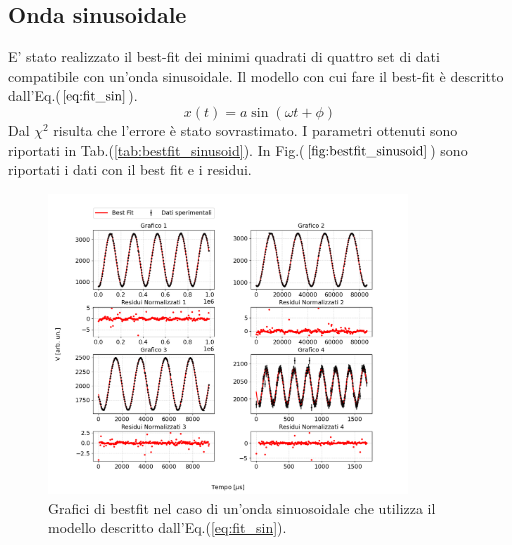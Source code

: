 \documentclass{article}
\begin{document}
    \subsection{Onda sinusoidale}
        E' stato realizzato il best-fit dei minimi quadrati
        di quattro set di dati compatibile con un'onda sinusoidale.
        Il modello con cui fare il best-fit è descritto dall'Eq.($\ref{eq:fit_sin}$).
            \begin{equation}
                x(t)=a \sin\left(\omega t+\phi\right)
                \label{eq:fit_sin}
            \end{equation} 
        Dal $\chi^2$ risulta che l'errore è stato sovrastimato. 
        I parametri ottenuti sono riportati in Tab.(\ref{tab:bestfit_sinusoid}).%
        In Fig.($\ref{fig:bestfit_sinusoid}$) sono riportati i dati con il best fit e 
        i residui.

            \begin{figure}[H]            
                \centering
                \includegraphics[width=0.85\textwidth]{bestfit_sinusoid.png} %
                \caption{Grafici di bestfit nel caso di un'onda sinuosoidale che utilizza il modello descritto dall'Eq.(\ref{eq:fit_sin}).
                }
                \label{fig:bestfit_sinusoid}

            \end{figure}    
\end{document}
